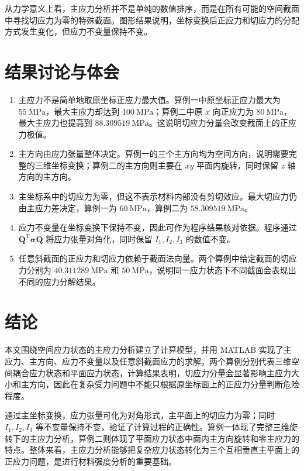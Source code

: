 \documentclass[UTF8,a4paper,12pt]{ctexart}
\newcommand{\stress}{\bm{\sigma}}
\newcommand{\vect}[1]{\bm{#1}}
\begin{document}
从力学意义上看，主应力分析并不是单纯的数值排序，而是在所有可能的空间截面中寻找切应力为零的特殊截面。图形结果说明，坐标变换后正应力和切应力的分配方式发生变化，但应力不变量保持不变。

\section{结果讨论与体会}

\begin{enumerate}[label=\arabic*.]
\item 主应力不是简单地取原坐标正应力最大值。算例一中原坐标正应力最大为 $55\ \mathrm{MPa}$，最大主应力却达到 $100\ \mathrm{MPa}$；算例二中原 $x$ 向正应力为 $80\ \mathrm{MPa}$，最大主应力也提高到 $88.309519\ \mathrm{MPa}$。这说明切应力分量会改变截面上的正应力极值。
\item 主方向由应力张量整体决定。算例一的三个主方向均为空间方向，说明需要完整的三维坐标变换；算例二的主方向则主要在 $xy$ 平面内旋转，同时保留 $z$ 轴方向的主方向。
\item 主坐标系中的切应力为零，但这不表示材料内部没有剪切效应。最大切应力仍由主应力差决定，算例一为 $60\ \mathrm{MPa}$，算例二为 $58.309519\ \mathrm{MPa}$。
\item 应力不变量在坐标变换下保持不变，因此可作为程序结果核对依据。程序通过 $\vect Q^{\mathrm T}\stress\vect Q$ 将应力张量对角化，同时保留 $I_1,I_2,I_3$ 的数值不变。
\item 任意斜截面的正应力和切应力依赖于截面法向量。两个算例中给定截面的切应力分别为 $40.311289\ \mathrm{MPa}$ 和 $50\ \mathrm{MPa}$，说明同一应力状态下不同截面会表现出不同的应力分解结果。
\end{enumerate}

\section{结论}

本文围绕空间应力状态的主应力分析建立了计算模型，并用 MATLAB 实现了主应力、主方向、应力不变量以及任意斜截面应力的求解。两个算例分别代表三维空间耦合应力状态和平面应力状态，计算结果表明，切应力分量会显著影响主应力大小和主方向，因此在复杂受力问题中不能只根据原坐标面上的正应力分量判断危险程度。

通过主坐标变换，应力张量可化为对角形式，主平面上的切应力为零；同时 $I_1,I_2,I_3$ 等不变量保持不变，验证了计算过程的正确性。算例一体现了完整三维旋转下的主应力分析，算例二则体现了平面应力状态中面内主方向旋转和零主应力的特点。整体来看，主应力分析能够把复杂应力状态转化为三个互相垂直主平面上的正应力问题，是进行材料强度分析的重要基础。
\end{document}
